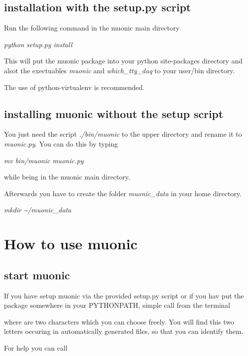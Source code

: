 \documentclass[letterpaper,10pt,english]{sphinxmanual}
\begin{document}
\subsection{installation with the setup.py script}
\label{setup:installation-with-the-setup-py-script}
Run the following command in the muonic main directory

\emph{python setup.py install}

This will put the muonic package into your python site-packages directory and alsot the exectuables \emph{muonic} and \emph{which\_tty\_daq} to your user/bin directory.

The use of python-virtualenv is recommended.


\subsection{installing muonic without the setup script}
\label{setup:installing-muonic-without-the-setup-script}
You just need the script \emph{./bin/muonic} to the upper directory and rename it to \emph{muonic.py}.
You can do this by typing

\emph{mv bin/muonic muonic.py}

while being in the muonic main directory.

Afterwards you have to create the folder \emph{muonic\_data} in your home directory.

\emph{mkdir \textasciitilde{}/muonic\_data}


\section{How to use muonic}
\label{tutorial::doc}\label{tutorial:how-to-use-muonic}

\subsection{start muonic}
\label{tutorial:start-muonic}
If you have setup muonic via the provided setup.py script or if you hav put the package somewhere in your PYTHONPATH, simple call from the terminal


where  are two characters which you can choose freely. You will find this two letters occuring in automatically generated files, so that you can identify them.

For help you can call

\end{document}
